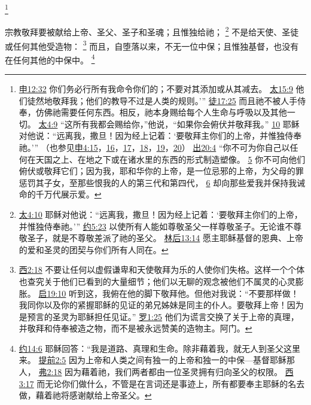 \documentclass[12pt, a4paper, oneside]{ctexart}
\newcounter{parnum}[section]
\newcommand{\N}{%
   \noindent\refstepcounter{parnum}%
    \makebox[\parindent][l]{\textbf{\arabic{parnum}.}}}
\begin{document}
	\footnote {
		\href{https://biblehub.com/deuteronomy/12-32.htm}{申12:32} 你们务必行所有我命令你们的；不要对其添加或从其减去。
		\href{https://biblehub.com/matthew/15-9.htm}{太15:9} 他们徒然地敬拜我；他们的教导不过是人类的规则。’”
		\href{https://biblehub.com/acts/17-25.htm}{徒17:25} 而且祂不被人手侍奉，仿佛祂需要任何东西。相反，祂本身赐给每个人生命与呼吸以及其他一切。
		\href{https://biblehub.com/matthew/4-9.htm}{太4:9} “这所有我都会赐给你，”他说，“如果你会俯伏并敬拜我。”
		\href{https://biblehub.com/matthew/4-10.htm}{10} 耶稣对他说：“远离我，撒旦！因为经上记着：‘要敬拜主你们的上帝，并惟独侍奉祂。’”
		（也参见\href{https://biblehub.com/deuteronomy/4-15.htm}{申4:15}，\href{https://biblehub.com/deuteronomy/4-16.htm}{16}，\href{https://biblehub.com/deuteronomy/4-17.htm}{17}，\href{https://biblehub.com/deuteronomy/4-18.htm}{18}，\href{https://biblehub.com/deuteronomy/4-19.htm}{19}，\href{https://biblehub.com/deuteronomy/4-20.htm}{20}）
		\href{https://biblehub.com/exodus/20-4.htm}{出20:4} “你不可为你自己以任何在天国之上、在地之下或在诸水里的东西的形式制造塑像。
		\href{https://biblehub.com/exodus/20-5.htm}{5} 你不可向他们俯伏或敬拜它们；因为我，耶和华你的上帝，是一位忌邪的上帝，为父母的罪惩罚其子女，至那些恨我的人的第三代和第四代，
		\href{https://biblehub.com/exodus/20-6.htm}{6} 却向那些爱我并保持我诫命的千万代展示爱。
	}

\N 宗教敬拜要被献给上帝、圣父、圣子和圣魂；且惟独给祂；
	\footnote {
		\href{https://biblehub.com/matthew/4-10.htm}{太4:10} 耶稣对他说：“远离我，撒旦！因为经上记着：‘要敬拜主你们的上帝，并惟独侍奉祂。’”
		\href{https://biblehub.com/john/5-23.htm}{约5:23} 以使所有人能如尊敬圣父一样尊敬圣子。无论谁不尊敬圣子，就是不尊敬差派了祂的圣父。
		\href{https://biblehub.com/2_corinthians/13-14.htm}{林后13:14} 愿主耶稣基督的恩典、上帝的爱和圣灵的团契与你们所有人同在。
	}
	不是给天使、圣徒或任何其他受造物：
	\footnote {
		\href{https://biblehub.com/colossians/2-18.htm}{西2:18} 不要让任何以虚假谦卑和天使敬拜为乐的人使你们失格。这样一个个体也查究关于他们已看到的大量细节；他们以无聊的观念被他们不属灵的心灵膨胀。
		\href{https://biblehub.com/revelation/19-10.htm}{启19:10} 听到这，我俯在他的脚下敬拜他。但他对我说：“不要那样做！我同你以及你的紧握耶稣的见证的弟兄姊妹是同主的仆人。要敬拜上帝！因为是预言的圣灵为耶稣担任见证。”
		\href{https://biblehub.com/romans/1-25.htm}{罗1:25} 他们为谎言交换了关于上帝的真理，并敬拜和侍奉被造之物，而不是被永远赞美的造物主。阿门。
	}
	而且，自堕落以来，不无一位中保；且惟独基督，也没有在任何其他的中保中。
	\footnote {
		\href{https://biblehub.com/john/14-6.htm}{约14:6} 耶稣回答：“我是道路、真理和生命。除非藉着我，就无人到圣父这里来。
		\href{https://biblehub.com/1_timothy/2-5.htm}{提前2:5} 因为上帝和人类之间有独一的上帝和独一的中保---基督耶稣那人，
		\href{https://biblehub.com/ephesians/2-18.htm}{弗2:18} 因为藉着祂，我们两者都由一位圣灵拥有归向圣父的权限。
		\href{https://biblehub.com/colossians/3-17.htm}{西3:17} 而无论你们做什么，不管是在言词还是事迹上，所有都要奉主耶稣的名去做，藉着祂将感谢献给上帝圣父。
	}
\end{document}
